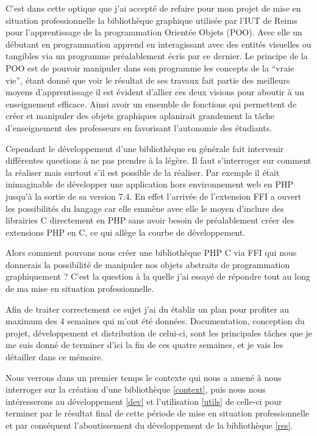 \documentclass[11pt,a4paper,krantz2,11pt,oneside]{krantz}
\begin{document}
C'est dans cette optique que j'ai accepté de refaire pour mon projet de mise en situation professionnelle la bibliothèque graphique utilisée par l'IUT de Reims pour l'apprentissage de la programmation Orientée Objets (POO). Avec elle un débutant en programmation apprend en interagissant avec des entités visuelles ou tangibles via un programme préalablement écris par ce dernier. Le principe de la POO est de pouvoir manipuler dans son programme les concepts de la ``vraie vie'', étant donné que voir le résultat de ses travaux fait partie des meilleurs moyens d'apprentissage il est évident d'allier ces deux visions pour aboutir à un enseignement efficace. Ainsi avoir un ensemble de fonctions qui permettent de créer et manipuler des objets graphiques aplanirait grandement la tâche d'enseignement des professeurs en favorisant l'autonomie des étudiants.

Cependant le développement d'une bibliothèque en générale fait intervenir différentes questions à ne pas prendre à la légère. Il faut s'interroger sur comment la réaliser mais surtout s'il est possible de la réaliser. Par exemple il était inimaginable de développer une application hors environnement web en PHP jusqu'à la sortie de sa version 7.4. En effet l'arrivée de l'extension FFI a ouvert les possibilités du langage car elle emmène avec elle le moyen d'inclure des librairies C directement en PHP sans avoir besoin de préalablement créer des extensions PHP en C, ce qui allège la courbe de développement.

Alors comment pouvons nous créer une bibliothèque PHP C via FFI qui nous donnerais la possibilité de manipuler nos objets abstraits de programmation graphiquement ? C'est la question à la quelle j'ai essayé de répondre tout au long de ma mise en situation professionnelle.

Afin de traiter correctement ce sujet j'ai du établir un plan pour profiter au maximum des 4 semaines qui m'ont été données. Documentation, conception du projet, développement et distribution de celui-ci, sont les principales tâches que je me suis donné de terminer d'ici la fin de ces quatre semaines, et je vais les détailler dans ce mémoire.

Nous verrons dans un premier temps le contexte qui nous a amené à nous interroger sur la création d'une bibliothèque \ref{context}, puis nous nous intéresserons au développement \ref{dev} et l'utilisation \ref{utils} de celle-ci pour terminer par le résultat final de cette période de mise en situation professionnelle et par conséquent l'aboutissement du développement de la bibliothèque \ref{res}.
\end{document}
